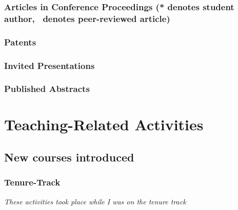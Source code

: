 \documentclass[10pt]{article}
\begin{document}
    \subsubsection[Articles in Conference Proceedings]{Articles in Conference Proceedings (* denotes student author, \textdagger\ denotes peer-reviewed article)}
    \begin{refsection}
        \nocite{*}
        \printbibliography[heading=none, type=inproceedings, notkeyword=tenuretrack]
    \end{refsection}
    \subsubsection{Patents}
    \begin{refsection}
        \nocite{*}
        \printbibliography[heading=none,type=patent, notkeyword=tenuretrack]
    \end{refsection}
    \subsubsection{Invited Presentations}
    \begin{enumerate}
    
    \end{enumerate}
    \subsubsection{Published Abstracts}
    \begin{enumerate}
    
    \end{enumerate}
    

\section{Teaching-Related Activities}
	\subsection{New courses introduced}
    \subsubsection{Tenure-Track}
    \emph{These activities took place while I was on the tenure track}
    \begin{enumerate}
    	
    \end{enumerate}
\end{document}

